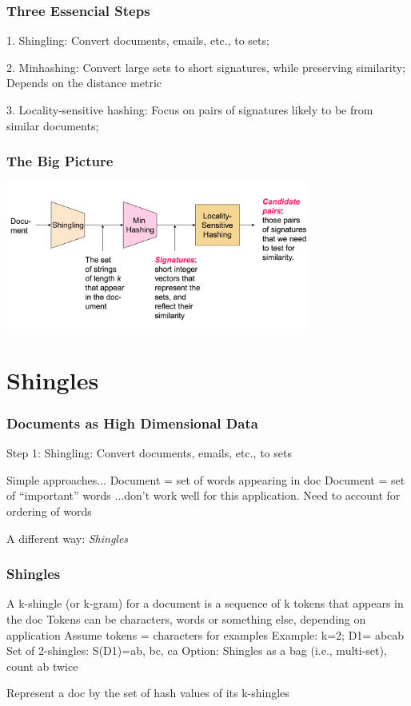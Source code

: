 \documentclass[svgnames]{beamer}
\begin{document}
  
\begin{frame} \frametitle{Three Essencial Steps}

1. Shingling: Convert documents, emails, etc., to sets;

2. Minhashing: Convert large sets to short signatures, while preserving similarity;
   Depends on the distance metric

3. Locality-sensitive hashing: Focus on pairs of signatures likely to be from similar documents;

\end{frame}

  
\begin{frame} \frametitle{The Big Picture}

\includegraphics[width=10cm]{overall}

\end{frame}

  
\section{Shingles}

  
\begin{frame} \frametitle{Documents as High Dimensional Data}

Step 1: Shingling: Convert documents, emails, etc., to sets

Simple approaches...
   Document = set of words appearing in doc
   Document = set of “important” words
...don’t work well for this application.
   Need to account for ordering of words

A different way: \emph{Shingles}

\end{frame}

  
\begin{frame} \frametitle{Shingles}

A k-shingle (or k-gram) for a document is a sequence of k tokens that appears in the doc
  Tokens can be characters, words or something else, depending on application
  Assume tokens = characters for examples
Example: k=2; D1= abcab
  Set of 2-shingles: S(D1)={ab, bc, ca}
  Option: Shingles as a bag (i.e., multi-set), count ab twice

Represent a doc by the set of hash values of its k-shingles

\end{frame}
\end{document}
